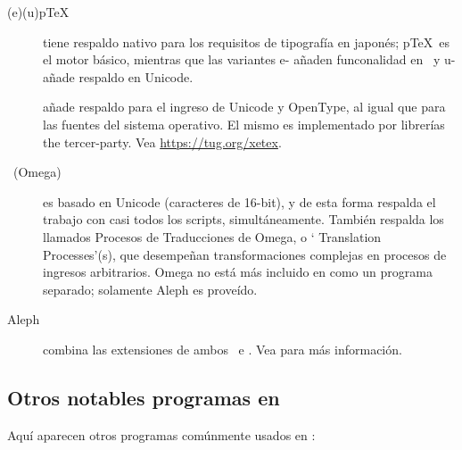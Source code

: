 \documentclass{article}
\begin{document}
\begin{description}
\item [(e)(u)p\TeX] tiene respaldo nativo para los requisitos de tipografía en japonés; p\TeX\ es el motor básico, mientras que las variantes e- añaden funconalidad en \eTeX\ y u- añade respaldo en Unicode.
 
\item [\XeTeX] añade respaldo para el ingreso de Unicode y OpenType,
	al igual que para las fuentes del sistema operativo. El mismo
	es implementado por librerías the tercer-party. Vea
	\url{https://tug.org/xetex}.

\item [\OMEGA\ (Omega)] es basado en Unicode (caracteres de 16-bit), y
	de esta forma respalda el trabajo con casi todos los scripts,
	simultáneamente. También respalda los llamados Procesos de
	Traducciones de Omega, o `\OMEGA{} Translation
	Processes'(s), que desempeñan transformaciones
	complejas en procesos de ingresos arbitrarios. Omega no está
	más incluido en \TL{} como un programa separado; solamente
	Aleph es proveído. 

\item [Aleph] combina las extensiones de ambos \OMEGA\ e \eTeX. Vea
	 para más información.

\end{description}

\subsection{Otros notables programas en \protect\TL}

Aquí aparecen otros programas comúnmente usados en \TL{}:
\end{document}
